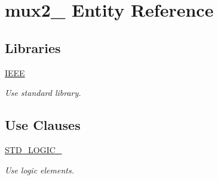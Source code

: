 \hypertarget{classmux2__1}{}\section{mux2\+\_ Entity Reference}
\label{classmux2__1}
\subsection*{Libraries}
 \begin{DoxyCompactItemize}
\item 
\mbox{\label{classmux2__1_aaa6aae5b5585d7ea0be78ee9add9ed3f}} 
\hyperlink{classmux2__1_aaa6aae5b5585d7ea0be78ee9add9ed3f}{I\+E\+EE} 
\begin{DoxyCompactList}\small\item\em Use standard library. \end{DoxyCompactList}\end{DoxyCompactItemize}
\subsection*{Use Clauses}
 \begin{DoxyCompactItemize}
\item 
\mbox{\label{classmux2__1_a039aaaa1d1b2b4f4bae0b0727a28811c}} 
\hyperlink{classmux2__1_a039aaaa1d1b2b4f4bae0b0727a28811c}{S\+T\+D\+\_\+\+L\+O\+G\+I\+C\+\_}   
\begin{DoxyCompactList}\small\item\em Use logic elements. \end{DoxyCompactList}\end{DoxyCompactItemize}
